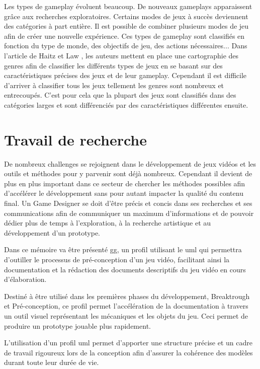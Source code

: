 Les types de gameplay évoluent beaucoup. De nouveaux gameplays apparaissent grâce aux recherches exploratoires. Certains modes de jeux à succès deviennent des catégories à part entière. Il est possible de combiner plusieurs modes de jeu afin de créer une nouvelle expérience. Ces types de gameplay sont classifiés en fonction du type de monde, des objectifs de jeu, des actions nécessaires... Dans l'article de Haitz et Law \cite{HeintzStephanie2015TGGM}, les auteurs mettent en place une cartographie des genres afin de classifier les différents types de jeux en se basant sur des caractéristiques précises des jeux et de leur gameplay. Cependant il est difficile d'arriver à classifier tous les jeux tellement les genres sont nombreux et entrecoupés. C'est pour cela que la plupart des jeux sont classifiés dans des catégories larges et sont différenciés par des caractéristiques différentes ensuite.



\section{Travail de recherche}
De nombreux challenges se rejoignent dans le développement de jeux vidéos et les outils et méthodes pour y parvenir sont déjà nombreux. Cependant il devient de plus en plus important dans ce secteur de chercher les méthodes possibles afin d'accélérer le développement sans pour autant impacter la qualité du contenu final. Un Game Designer se doit d'être précis et concis dans ses recherches et ses communications afin de communiquer un maximum d'informations et de pouvoir dédier plus de temps à l'exploration, à la recherche artistique et au développement d'un prototype. 

Dans ce mémoire va être présenté \gls{gg}, un profil utilisant le \gls{uml} qui permettra d'outiller le processus de pré-conception d'un jeu vidéo, facilitant ainsi la documentation et la rédaction des documents descriptifs du jeu vidéo en cours d'élaboration.

Destiné à être utilisé dans les premières phases du développement, Breaktrough et Pré-conception, ce profil permet l'accélération de la documentation à travers un outil visuel représentant les mécaniques et les objets du jeu. Ceci permet de produire un prototype jouable plus rapidement.

L'utilisation d'un profil \gls{uml} permet d'apporter une structure précise et un cadre de travail rigoureux lors de la conception afin d'assurer la cohérence des modèles durant toute leur durée de vie.

